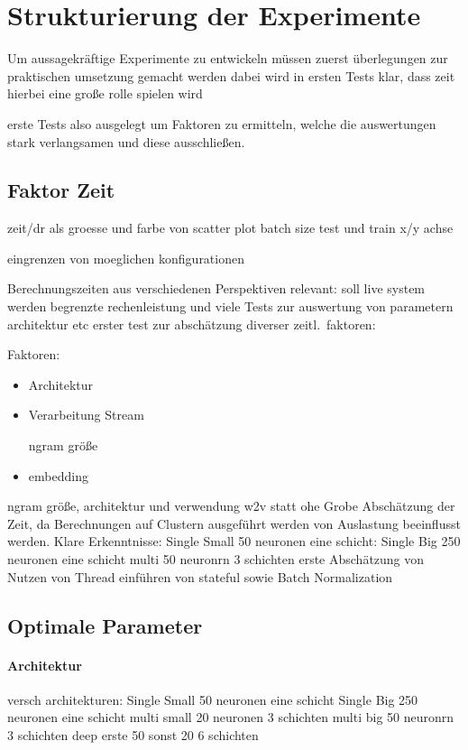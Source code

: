 \iffalse
    \section{Strukturierung der Experimente}\label{sec:StrukExp}
        Um aussagekräftige Experimente zu entwickeln müssen zuerst 
        überlegungen zur praktischen umsetzung gemacht werden
        dabei wird in ersten Tests klar, dass zeit hierbei eine große rolle spielen wird

        erste Tests also ausgelegt um Faktoren zu ermitteln, welche die auswertungen stark verlangsamen
        und diese ausschließen.

        \subsection{Faktor Zeit}
            zeit/dr als groesse und farbe von scatter plot
            batch size test und train x/y achse

            eingrenzen von moeglichen konfigurationen

            Berechnungszeiten aus verschiedenen Perspektiven relevant:
            soll live system werden
            begrenzte rechenleistung und viele Tests zur auswertung von parametern architektur etc
            erster test zur abschätzung diverser zeitl.\ faktoren:

            Faktoren:
            \begin{itemize}
                \item Architektur
                \item Verarbeitung Stream

                     ngram größe
                \item embedding
            \end{itemize}
            ngram größe, architektur und verwendung w2v statt ohe
            Grobe Abschätzung der Zeit, da Berechnungen auf Clustern ausgeführt werden von Auslastung beeinflusst werden.
            Klare Erkenntnisse:
            Single Small 50 neuronen eine schicht:
            Single Big 250 neuronen eine schicht
            multi 50 neuronrn 3 schichten
            erste Abschätzung von Nutzen von Thread 
            einführen von stateful sowie Batch Normalization
        \subsection{Optimale Parameter}
            \paragraph{Architektur}
                versch architekturen:
                Single Small 50 neuronen eine schicht
                Single Big 250 neuronen eine schicht
                multi small 20 neuronen 3 schichten
                multi big 50 neuronrn 3 schichten
                deep erste 50 sonst 20 6 schichten

